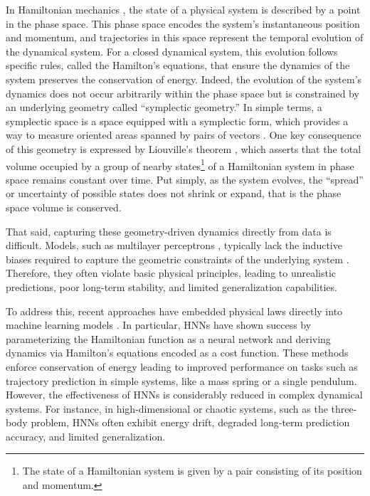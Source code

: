 \documentclass{article}
\theoremstyle{plain}
\theoremstyle{definition}
\theoremstyle{remark}
\begin{document}
In Hamiltonian mechanics \cite{goldstein:mechanics}, the state of a physical system is described by a point in the phase space. This phase space encodes the system’s instantaneous position and momentum, and trajectories in this space represent the temporal evolution of the dynamical system. For a closed dynamical system, this evolution follows specific rules, called the Hamilton’s equations, that ensure the dynamics of the system preserves the conservation of energy. Indeed, the evolution of the system’s dynamics does not occur arbitrarily within the phase space but is constrained by an underlying geometry called “symplectic geometry.” In simple terms, a symplectic space is a space equipped with a symplectic form, which provides a way to measure oriented areas spanned by pairs of vectors \cite{arnold1989mathematical}. One key consequence of this geometry is expressed by Liouville’s theorem \cite{Liouville1838}, which asserts that the total volume occupied by a group of nearby states\footnote{The state of a Hamiltonian system is given by a pair consisting of its position and momentum.} of a Hamiltonian system in phase space remains constant over time. Put simply, as the system evolves, the “spread” or uncertainty of possible states does not shrink or expand, that is the phase space volume is conserved.

That said, capturing these geometry-driven dynamics directly from data is difficult. Models, such as multilayer perceptrons \cite{lecun2015deep}, typically lack the inductive biases required to capture the geometric constraints of the underlying system \cite{need_for_biases, inductive_biases}. Therefore, they often violate basic physical principles, leading to unrealistic predictions, poor long-term stability, and limited generalization capabilities. 

To address this, recent approaches have embedded physical laws directly into machine learning models \cite{governingequationsdiscovery, hamiltonian_neural_networks, deepleangragiaannetworks, lnns,  symplecticrecurrentneuralnetworks, simple_hnn_lnn, generalizedhamiltoninas}. In particular, HNNs \cite{hamiltonian_neural_networks} have shown success by parameterizing the Hamiltonian function as a neural network and deriving dynamics via Hamilton’s equations encoded as a cost function. These methods enforce conservation of energy leading to improved performance on tasks such as trajectory prediction in simple systems, like a mass spring or a single pendulum. However, the effectiveness of HNNs is considerably reduced in complex dynamical systems. For instance, in high-dimensional or chaotic systems, such as the three-body problem, HNNs often exhibit energy drift, degraded long-term prediction accuracy, and limited generalization.
\end{document}
